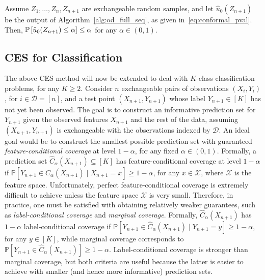 \begin{theorem}\label{thm:od_full}
Assume $Z_{1}, \ldots, Z_{n}, Z_{n+1}$ are exchangeable random samples, and let $\hat{u}_0(Z_{n+1})$ be the output of Algorithm~\ref{alg:od_full_seq}, as given in~\eqref{eq:conformal_pval}. Then, $\P{\hat{u}_0(Z_{n+1}) \leq \alpha} \leq \alpha$ for any $\alpha \in (0,1)$.
\end{theorem}





\subsection{CES for Classification}  \label{sec:classification}

The above CES method will now be extended to deal with $K$-class classification problems, for any $K \geq 2$.
Consider $n$ exchangeable pairs of observations $(X_i,Y_i)$, for $i \in \mathcal{D} = [n]$, and a test point $(X_{n+1}, Y_{n+1})$ whose label $Y_{n+1} \in [K]$ has not yet been observed. The goal is to construct an informative prediction set for $Y_{n+1}$ given the observed features $X_{n+1}$ and the rest of the data, assuming $(X_{n+1},Y_{n+1})$ is exchangeable with the observations indexed by $\mathcal{D}$.
An ideal goal would be to construct the smallest possible prediction set with guaranteed {\em feature-conditional coverage} at level $1-\alpha$, for any fixed $\alpha \in (0,1)$. Formally, a prediction set $\hat{C}_{\alpha}(X_{n+1}) \subseteq [K]$ has feature-conditional coverage at level $1-\alpha$ if $\mathbb{P}[Y_{n+1} \in \hat{C}_{\alpha}(X_{n+1}) \mid X_{n+1} = x] \geq 1-\alpha$, for any $x \in \mathcal{X}$, where $\mathcal{X}$ is the feature space.
Unfortunately, perfect feature-conditional coverage is extremely difficult to achieve unless the feature space $\mathcal{X}$ is very small. Therefore, in practice, one must be satisfied with obtaining relatively weaker guarantees, such as {\em label-conditional coverage} and {\em marginal coverage}. Formally,  $\hat{C}_{\alpha}(X_{n+1})$ has $1-\alpha$ label-conditional coverage if $\mathbb{P}[Y_{n+1} \in \hat{C}_{\alpha}(X_{n+1}) \mid Y_{n+1} = y] \geq 1-\alpha$, for any $y \in [K]$, while marginal coverage corresponds to $\mathbb{P}[Y_{n+1} \in \hat{C}_{\alpha}(X_{n+1}) ] \geq 1-\alpha$. Label-conditional coverage is stronger than marginal coverage, but both criteria are useful because the latter is easier to achieve with smaller (and hence more informative) prediction sets.


